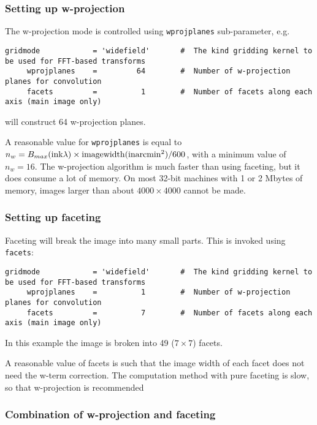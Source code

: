 \subsubsection{Setting up w-projection}
\label{section:im.clean.widefield.wproj}

The w-projection mode is controlled using {\tt wprojplanes}
sub-parameter, e.g. 
\small
\begin{verbatim}
gridmode            = 'widefield'       #  The kind gridding kernel to be used for FFT-based transforms
     wprojplanes    =         64        #  Number of w-projection planes for convolution
     facets         =          1        #  Number of facets along each axis (main image only)
\end{verbatim}
\normalsize
will construct 64 w-projection planes.

A reasonable value for {\tt wprojplanes} is equal to $n_w = B_{max}({\rm in k}\lambda)
\times {\rm imagewidth}({\rm in arcmin}^2) / 600$, with a minimum value of $n_w=16$.  The
w-projection algorithm is much faster than using faceting, but it does
consume a lot of memory.  On most 32-bit machines with 1 or 2 Mbytes
of memory, images larger than about $4000\times 4000$ cannot be made.

\subsubsection{Setting up faceting}
\label{section:im.clean.widefieldfacet}

Faceting will break the image into many small parts.  This
is invoked using {\tt facets}:
\small
\begin{verbatim}
gridmode            = 'widefield'       #  The kind gridding kernel to be used for FFT-based transforms
     wprojplanes    =          1        #  Number of w-projection planes for convolution
     facets         =          7        #  Number of facets along each axis (main image only)
\end{verbatim}
\normalsize
In this example the image is broken into 49 ($7\times7$) facets.

A reasonable value of facets is such that the image width of each facet
does not need the w-term correction.  The computation method with pure
faceting is slow, so that w-projection is recommended

\subsubsection{Combination of w-projection and faceting}
\label{section:im.clean.widefield.combo}

